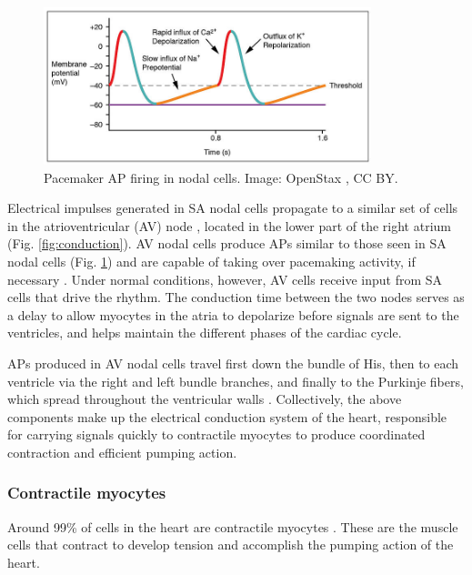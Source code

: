 \documentclass[12pt]{article}
\begin{document}
\begin{figure}[h!]
\centering
\includegraphics[width=0.85\textwidth]{figures/pacemaker.jpg}
\caption{Pacemaker AP firing in nodal cells. Image: OpenStax \citep{openStaxElectrical}, CC BY.}
\label{fig:nodeAP}
\end{figure}
 
Electrical impulses generated in SA nodal cells propagate to a similar set of cells in the atrioventricular (AV) node \cite{openStaxElectrical,mohrman2006cardiovascular}, located in the lower part of the right atrium (Fig. \ref{fig:conduction}). AV nodal cells produce APs similar to those seen in SA nodal cells (Fig. \ref{fig:nodeAP}) and are capable of taking over pacemaking activity, if necessary \cite{feher2012quantitative,guyton2016book}. Under normal conditions, however, AV cells receive input from SA cells that drive the rhythm. The conduction time between the two nodes serves as a delay to allow myocytes in the atria to depolarize before signals are sent to the ventricles, and helps maintain the different phases of the cardiac cycle.

APs produced in AV nodal cells travel first down the bundle of His, then to each ventricle via the right and left bundle branches, and finally to the Purkinje fibers, which spread throughout the ventricular walls \cite{openStaxElectrical,feher2012quantitative}. Collectively, the above components make up the electrical conduction system of the heart, responsible for carrying signals quickly to contractile myocytes to produce coordinated contraction and efficient pumping action.

\subsubsection*{Contractile myocytes}

Around 99\% of cells in the heart are contractile myocytes \cite{openStaxElectrical}. These are the muscle cells that contract to develop tension and accomplish the pumping action of the heart.
\end{document}
